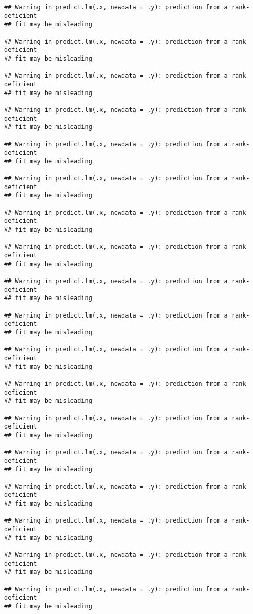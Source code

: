 \documentclass[]{article}
\begin{document}
\begin{verbatim}
## Warning in predict.lm(.x, newdata = .y): prediction from a rank-deficient
## fit may be misleading

## Warning in predict.lm(.x, newdata = .y): prediction from a rank-deficient
## fit may be misleading

## Warning in predict.lm(.x, newdata = .y): prediction from a rank-deficient
## fit may be misleading

## Warning in predict.lm(.x, newdata = .y): prediction from a rank-deficient
## fit may be misleading

## Warning in predict.lm(.x, newdata = .y): prediction from a rank-deficient
## fit may be misleading

## Warning in predict.lm(.x, newdata = .y): prediction from a rank-deficient
## fit may be misleading

## Warning in predict.lm(.x, newdata = .y): prediction from a rank-deficient
## fit may be misleading

## Warning in predict.lm(.x, newdata = .y): prediction from a rank-deficient
## fit may be misleading

## Warning in predict.lm(.x, newdata = .y): prediction from a rank-deficient
## fit may be misleading

## Warning in predict.lm(.x, newdata = .y): prediction from a rank-deficient
## fit may be misleading

## Warning in predict.lm(.x, newdata = .y): prediction from a rank-deficient
## fit may be misleading

## Warning in predict.lm(.x, newdata = .y): prediction from a rank-deficient
## fit may be misleading

## Warning in predict.lm(.x, newdata = .y): prediction from a rank-deficient
## fit may be misleading

## Warning in predict.lm(.x, newdata = .y): prediction from a rank-deficient
## fit may be misleading

## Warning in predict.lm(.x, newdata = .y): prediction from a rank-deficient
## fit may be misleading

## Warning in predict.lm(.x, newdata = .y): prediction from a rank-deficient
## fit may be misleading

## Warning in predict.lm(.x, newdata = .y): prediction from a rank-deficient
## fit may be misleading

## Warning in predict.lm(.x, newdata = .y): prediction from a rank-deficient
## fit may be misleading


\end{verbatim}
\end{document}
